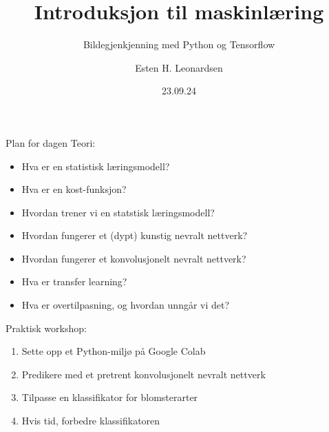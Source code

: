 \documentclass[8pt]{beamer}
\date{23.09.24}
\title{Introduksjon til maskinlæring}
\subtitle{Bildegjenkjenning med Python og Tensorflow}
\author{Esten H. Leonardsen}
\begin{document}
	 \begin{frame}
	 	\maketitle
	 \end{frame}

	\begin{frame}{Plan for dagen}
		\vfill
		Teori:
		\begin{itemize}
			\item Hva er en statistisk læringsmodell?
			\item Hva er en kost-funksjon?
			\item Hvordan trener vi en statstisk læringsmodell?
			\item Hvordan fungerer et (dypt) kunstig nevralt nettverk?
			\item Hvordan fungerer et konvolusjonelt nevralt nettverk?
			\item Hva er transfer learning?
			\item Hva er overtilpasning, og hvordan unngår vi det?
		\end{itemize}
		Praktisk workshop:
		\begin{enumerate}
			\item Sette opp et Python-miljø på Google Colab
			\item Predikere med et pretrent konvolusjonelt nevralt nettverk
			\item Tilpasse en klassifikator for blomsterarter
			\item Hvis tid, forbedre klassifikatoren
		\end{enumerate}
		\vfill
	\end{frame}



\end{document}
